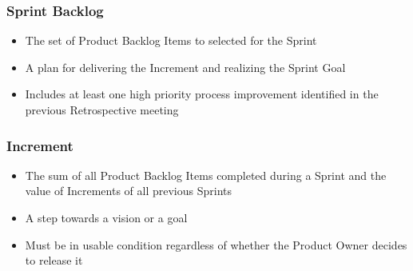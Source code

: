 \begin{frame}
	\frametitle{Sprint Backlog}
	\begin{itemize}
		\setlength\itemsep{0.7em}
		\item The set of Product Backlog Items to selected for the Sprint
		\item A plan for delivering the Increment and realizing the Sprint Goal
		\item Includes at least one high priority process improvement identified in the previous Retrospective meeting
	\end{itemize}
\end{frame}

\begin{frame}
	\frametitle{Increment}
	\begin{itemize}
		\setlength\itemsep{0.7em}
		\item The sum of all Product Backlog Items completed during a Sprint and the value of Increments of all previous Sprints
		\item A step towards a vision or a goal
		\item Must be in usable condition regardless of whether the Product Owner decides to release it
	\end{itemize}
\end{frame}